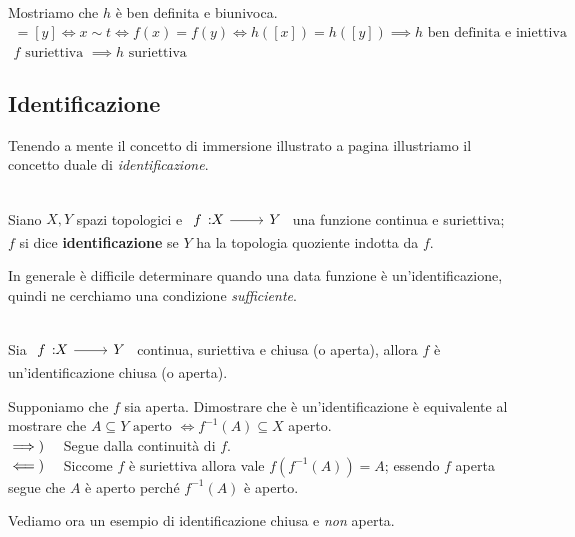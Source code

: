 Mostriamo che $h$ è ben definita e biunivoca.
	\begin{gather*}
		[x]=[y]\iff x\sim t\iff f(x)=f(y)\iff h([x])=h([y]) \implies h \text{ ben definita e iniettiva }\\
		f \text{ suriettiva } \implies h \text{ suriettiva}
	\end{gather*}
\subsection{Identificazione}
Tenendo a mente il concetto di immersione illustrato a pagina \pageref{immersione} illustriamo il concetto duale di \textit{identificazione}.
\begin{define}[Identificazione.]~{}\\
	Siano $X,Y$ spazi topologici e $\funz f X Y$ una funzione continua e suriettiva; $f$ si dice \textbf{identificazione} se $Y$ ha la topologia quoziente indotta da $f$.
\end{define}
In generale è difficile determinare quando una data funzione è un'identificazione, quindi ne cerchiamo una condizione \textit{sufficiente}.
\begin{theorema}~{}\label{condizione sufficiente identificazione}\\
Sia $\funz f X Y$ continua, suriettiva e chiusa (o aperta), allora $f$ è un'identificazione chiusa (o aperta).
\end{theorema}
\begin{demonstration}
	Supponiamo che $f$ sia aperta. Dimostrare che è un'identificazione è equivalente al mostrare che $\displaystyle A\subseteq Y \text{ aperto } \iff f^{-1}(A)\subseteq X$ aperto.\\
	$\implies)\quad$ Segue dalla continuità di $f$.\\
	$\impliedby)\quad$ Siccome $f$ è suriettiva allora vale $f(f^{-1}(A))=A$; essendo $f$ aperta segue che $A$ è aperto perché $f^{-1}(A)$ è aperto.
\end{demonstration}
Vediamo ora un esempio di identificazione chiusa e \textit{non} aperta.
